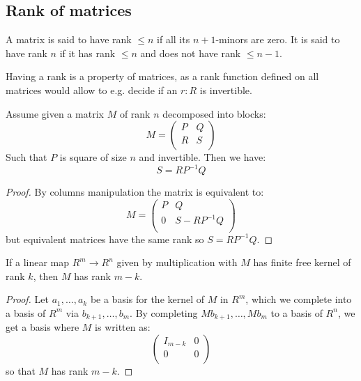 \subsection{Rank of matrices}

\begin{definition}
A matrix is said to have rank $\leq n$ if all its $n+1$-minors are zero. It is said to have rank $n$ if it has rank $\leq n$ and does not have rank $\leq n-1$.
\end{definition}

Having a rank is a property of matrices, as a rank function defined on all matrices would allow to e.g. decide if an $r:R$ is invertible.

\begin{lemma}\label{rank-bloc-matrix}
Assume given a matrix $M$ of rank $n$ decomposed into blocks:
\[M = \begin{pmatrix}
P & Q  \\
R & S \\
\end{pmatrix}\]
Such that $P$ is square of size $n$ and invertible. Then we have:
\[S = RP^{-1}Q\]
\end{lemma}

\begin{proof}
By columns manipulation the matrix is equivalent to:
\[M = \begin{pmatrix}
P & Q  \\
0 & S - RP^{-1}Q \\
\end{pmatrix}\]
but equivalent matrices have the same rank so $S=RP^{-1}Q$.
\end{proof}

\begin{lemma}\label{rank-equivalent-definitions}
If a linear map $R^m \to R^n$ given by multiplication with $M$
has finite free kernel of rank $k$, then $M$ has rank $m-k$.
\end{lemma}

\begin{proof}
  Let $a_1,\dots,a_{k}$ be a basis for the kernel of $M$ in $R^m$, which we complete into a basis of $R^m$ via $b_{k+1},\dots,b_m$.
  By completing $Mb_{k+1},\dots, Mb_m$ to a basis of $R^n$, we get a basis where $M$ is written as:
\[\begin{pmatrix}
I_{m-k} & 0  \\
0 & 0 \\
\end{pmatrix}\]
so that $M$ has rank $m-k$.
\end{proof}

